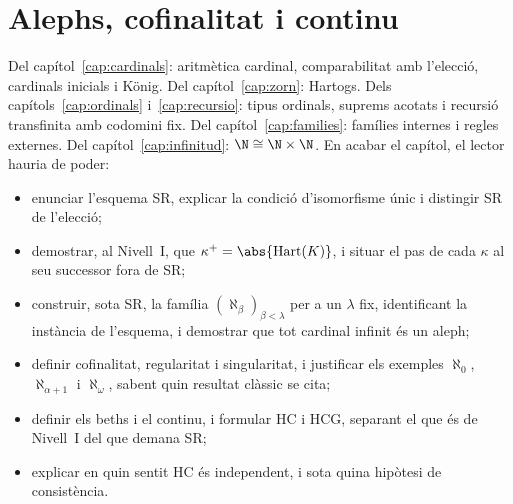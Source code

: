 \chapter{Alephs, cofinalitat i continu}\label{cap:alephs}

\begin{objectius}
 Del capítol~\ref{cap:cardinals}: aritmètica cardinal, comparabilitat amb l'elecció, cardinals inicials i König. Del capítol~\ref{cap:zorn}: Hartogs. Dels capítols~\ref{cap:ordinals} i~\ref{cap:recursio}: tipus ordinals, suprems acotats i recursió transfinita amb codomini fix. Del capítol~\ref{cap:families}: famílies internes i regles externes. Del capítol~\ref{cap:infinitud}: \(\N\cong\N\times\N\).
 En acabar el capítol, el lector hauria de poder:
\begin{itemize}
  \item enunciar l'esquema SR, explicar la condició d'isomorfisme únic i distingir SR de l'elecció;
  \item demostrar, al Nivell~I, que \(\kappa^{+}=\abs{\Hart(K)}\), i situar el pas de cada \(\kappa\) al seu successor fora de SR;
  \item construir, sota SR, la família \((\aleph_\beta)_{\beta<\lambda}\) per a un \(\lambda\) fix, identificant la instància de l'esquema, i demostrar que tot cardinal infinit és un aleph;
  \item definir cofinalitat, regularitat i singularitat, i justificar els exemples \(\aleph_0\), \(\aleph_{\alpha+1}\) i \(\aleph_\omega\), sabent quin resultat clàssic se cita;
  \item definir els beths i el continu, i formular HC i HCG, separant el que és de Nivell~I del que demana SR;
  \item explicar en quin sentit HC és independent, i sota quina hipòtesi de consistència.
\end{itemize}
\end{objectius}


